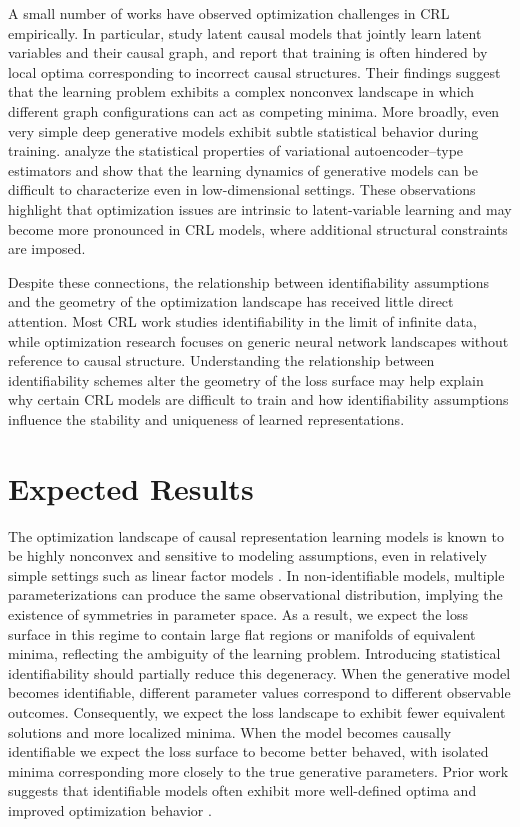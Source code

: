 \documentclass{article} %
\begin{document}
A small number of works have observed optimization challenges in CRL empirically. In particular, \citet{Brehmer2022LatentCausalModels} study latent causal models that jointly learn latent variables and their causal graph, and report that training is often hindered by local optima corresponding to incorrect causal structures. Their findings suggest that the learning problem exhibits a complex nonconvex landscape in which different graph configurations can act as competing minima. More broadly, even very simple deep generative models exhibit subtle statistical behavior during training. \citet{KwonChae2024VAE} analyze the statistical properties of variational autoencoder–type estimators and show that the learning dynamics of generative models can be difficult to characterize even in low-dimensional settings. These observations highlight that optimization issues are intrinsic to latent-variable learning and may become more pronounced in CRL models, where additional structural constraints are imposed.

Despite these connections, the relationship between identifiability assumptions and the geometry of the optimization landscape has received little direct attention. Most CRL work studies identifiability in the limit of infinite data, while optimization research focuses on generic neural network landscapes without reference to causal structure. Understanding the relationship between identifiability schemes alter the geometry of the loss surface may help explain why certain CRL models are difficult to train and how identifiability assumptions influence the stability and uniqueness of learned representations.

\section{Expected Results}

The optimization landscape of causal representation learning models is known to be highly nonconvex and sensitive to modeling assumptions, even in relatively simple settings such as linear factor models \cite{Moran2026CRLFramework}. In non-identifiable models, multiple parameterizations can produce the same observational distribution, implying the existence of symmetries in parameter space. As a result, we expect the loss surface in this regime to contain large flat regions or manifolds of equivalent minima, reflecting the ambiguity of the learning problem. Introducing statistical identifiability should partially reduce this degeneracy. When the generative model becomes identifiable, different parameter values correspond to different observable outcomes. Consequently, we expect the loss landscape to exhibit fewer equivalent solutions and more localized minima. When the model becomes causally identifiable we expect the loss surface to become better behaved, with isolated minima corresponding more closely to the true generative parameters. Prior work suggests that identifiable models often exhibit more well-defined optima and improved optimization behavior \cite{Moran2026CRLFramework, KwonChae2024VAE}.

\newpage



\end{document}
